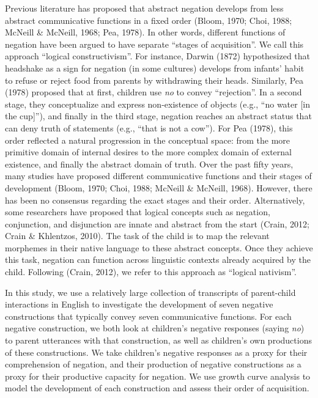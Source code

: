 \documentclass[
  man,floatsintext]{apa6}
\begin{document}
Previous literature has proposed that abstract negation develops from less abstract communicative functions in a fixed order (Bloom, 1970; Choi, 1988; McNeill \& McNeill, 1968; Pea, 1978). In other words, different functions of negation have been argued to have separate ``stages of acquisition''. We call this approach ``logical constructivism''. For instance, Darwin (1872) hypothesized that headshake as a sign for negation (in some cultures) develops from infants' habit to refuse or reject food from parents by withdrawing their heads. Similarly, Pea (1978) proposed that at first, children use \emph{no} to convey ``rejection''. In a second stage, they conceptualize and express non-existence of objects (e.g., ``no water {[}in the cup{]}''), and finally in the third stage, negation reaches an abstract status that can deny truth of statements (e.g., ``that is not a cow''). For Pea (1978), this order reflected a natural progression in the conceptual space: from the more primitive domain of internal desires to the more complex domain of external existence, and finally the abstract domain of truth. Over the past fifty years, many studies have proposed different communicative functions and their stages of development (Bloom, 1970; Choi, 1988; McNeill \& McNeill, 1968). However, there has been no consensus regarding the exact stages and their order. Alternatively, some researchers have proposed that logical concepts such as negation, conjunction, and disjunction are innate and abstract from the start (Crain, 2012; Crain \& Khlentzos, 2010). The task of the child is to map the relevant morphemes in their native language to these abstract concepts. Once they achieve this task, negation can function across linguistic contexts already acquired by the child. Following (Crain, 2012), we refer to this approach as ``logical nativism''.

In this study, we use a relatively large collection of transcripts of parent-child interactions in English to investigate the development of seven negative constructions that typically convey seven communicative functions. For each negative construction, we both look at children's negative responses (saying \emph{no}) to parent utterances with that construction, as well as children's own productions of these constructions. We take children's negative responses as a proxy for their comprehension of negation, and their production of negative constructions as a proxy for their productive capacity for negation. We use growth curve analysis to model the development of each construction and assess their order of acquisition.
\end{document}

